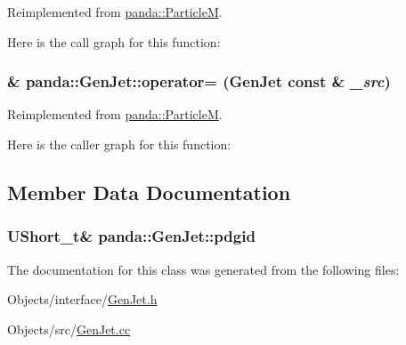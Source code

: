 Reimplemented from \hyperlink{classpanda_1_1ParticleM_a042f9e295576be022960ea88144e9022}{panda::ParticleM}.

Here is the call graph for this function:\hypertarget{classpanda_1_1GenJet_aeaa1c9ce79a2ac5e7d49ff5ea1e34136}{
\subsubsection[{operator=}]{ \& panda::GenJet::operator= ({\bf GenJet} const \& {\em \_\-src})}}
\label{classpanda_1_1GenJet_aeaa1c9ce79a2ac5e7d49ff5ea1e34136}


Reimplemented from \hyperlink{classpanda_1_1ParticleM_a37f7be4e1150b6080b47b005af730af5}{panda::ParticleM}.

Here is the caller graph for this function:

\subsection{Member Data Documentation}
\hypertarget{classpanda_1_1GenJet_a6b39b34d6884f77520bab3129aa1c3b3}{
\subsubsection[{pdgid}]{\setlength{\rightskip}{0pt plus 5cm}UShort\_\-t\& {\bf panda::GenJet::pdgid}}}
\label{classpanda_1_1GenJet_a6b39b34d6884f77520bab3129aa1c3b3}


The documentation for this class was generated from the following files:\begin{DoxyCompactItemize}
\item 
Objects/interface/\hyperlink{GenJet_8h}{GenJet.h}\item 
Objects/src/\hyperlink{GenJet_8cc}{GenJet.cc}\end{DoxyCompactItemize}
